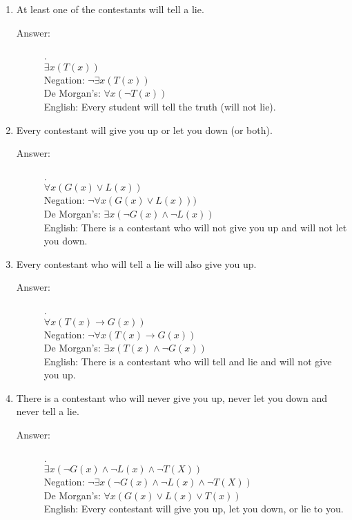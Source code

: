 \documentclass[12pt, oneside]{article}
\begin{document}
\begin{enumerate}
\begin{enumerate}
    \item At least one of the contestants will tell a lie.
    \begin{description}
        \item[Answer:] .\\
        $\exists x (T(x))$ \\
        Negation: $\lnot \exists x (T(x))$ \\
        De Morgan's: $\forall x (\lnot T(x))$ \\
        English: Every student will tell the truth (will not lie).
    \end{description}
    \item Every contestant will give you up or let you down (or both).
    \begin{description}
        \item[Answer:] .\\
        $\forall x (G(x) \lor L(x))$ \\
        Negation: $\lnot \forall x (G(x) \lor L(x)))$ \\
        De Morgan's: $\exists x (\lnot G(x) \land \lnot L(x))$ \\
        English: There is a contestant who will not give you up and will not let you down.
    \end{description}
    \item Every contestant who will tell a lie will also give you up.
    \begin{description}
        \item[Answer:] .\\
        $\forall x (T(x) \rightarrow G(x))$ \\
        Negation: $\lnot \forall x (T(x) \rightarrow G(x))$ \\
        De Morgan's: $\exists x (T(x) \land \lnot G(x))$ \\
        English: There is a contestant who will tell and lie and will not give you up.
    \end{description}
    \item There is a contestant who will never give you up, never let you down and never tell a lie.
    \begin{description}
        \item[Answer:] .\\
        $\exists x (\lnot G(x) \land \lnot L(x) \land \lnot T(X))$ \\
        Negation: $\lnot \exists x (\lnot G(x) \land \lnot L(x) \land \lnot T(X))$ \\
        De Morgan's: $\forall x (G(x) \lor L(x) \lor T(x))$ \\
        English: Every contestant will give you up, let you down, or lie to you.
    \end{description}
\end{enumerate}



\end{enumerate}
\end{document}
